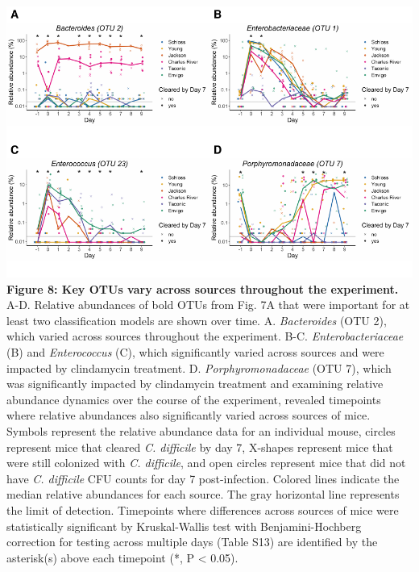 \documentclass[11pt,]{article}
\begin{document}
\newpage

\includegraphics{figure_8.pdf} \textbf{Figure 8: Key OTUs vary across
sources throughout the experiment.} A-D. Relative abundances of bold
OTUs from Fig. 7A that were important for at least two classification
models are shown over time. A. \emph{Bacteroides} (OTU 2), which varied
across sources throughout the experiment. B-C. \emph{Enterobacteriaceae}
(B) and \emph{Enterococcus} (C), which significantly varied across
sources and were impacted by clindamycin treatment. D.
\emph{Porphyromonadaceae} (OTU 7), which was significantly impacted by
clindamycin treatment and examining relative abundance dynamics over the
course of the experiment, revealed timepoints where relative abundances
also significantly varied across sources of mice. Symbols represent the
relative abundance data for an individual mouse, circles represent mice
that cleared \emph{C. difficile} by day 7, X-shapes represent mice that
were still colonized with \emph{C. difficile}, and open circles
represent mice that did not have \emph{C. difficile} CFU counts for day
7 post-infection. Colored lines indicate the median relative abundances
for each source. The gray horizontal line represents the limit of
detection. Timepoints where differences across sources of mice were
statistically significant by Kruskal-Wallis test with Benjamini-Hochberg
correction for testing across multiple days (Table S13) are identified
by the asterisk(s) above each timepoint (*, P \textless{} 0.05).

\newpage
\end{document}
